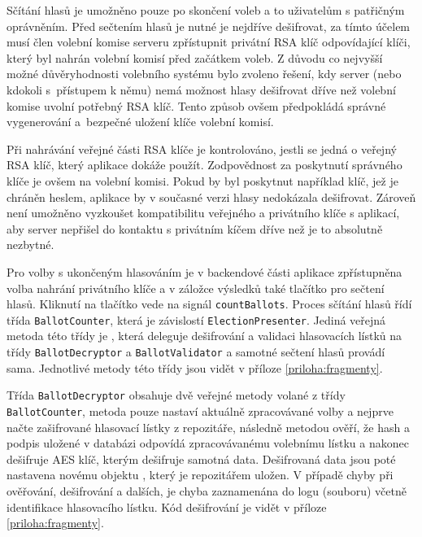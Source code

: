 Sčítání hlasů je umožněno pouze po skončení voleb a to uživatelům s patřičným oprávněním. Před sečtením hlasů je nutné je nejdříve dešifrovat, za tímto účelem musí člen volební komise serveru zpřístupnit privátní RSA klíč odpovídající klíči, který byl nahrán volební komisí před začátkem voleb. Z důvodu co nejvyšší možné důvěryhodnosti volebního systému bylo zvoleno řešení, kdy server (nebo kdokoli s~přístupem k němu) nemá možnost hlasy dešifrovat dříve než volební komise uvolní potřebný RSA klíč. Tento způsob ovšem předpokládá správné vygenerování a~bezpečné uložení klíče volební komisí.

Při nahrávání veřejné části RSA klíče je kontrolováno, jestli se jedná o veřejný RSA klíč, který aplikace dokáže použít. Zodpovědnost za poskytnutí správného klíče je ovšem na volební komisi. Pokud by byl poskytnut například klíč, jež je chráněn heslem, aplikace by v současné verzi hlasy nedokázala dešifrovat. Zároveň není umožněno vyzkoušet kompatibilitu veřejného a privátního klíče s aplikací, aby server nepřišel do kontaktu s privátním kíčem dříve než je to absolutně nezbytné.

Pro volby s ukončeným hlasováním je v backendové části aplikace zpřístupněna volba nahrání privátního klíče a v záložce výsledků také tlačítko pro sečtení hlasů. Kliknutí na tlačítko vede na signál \texttt{countBallots}. Proces sčítání hlasů řídí třída \texttt{BallotCounter}, která je závislostí \texttt{ElectionPresenter}. Jediná veřejná metoda této třídy je %
, která deleguje dešifrování a validaci hlasovacích lístků na třídy \texttt{BallotDecryptor} a \texttt{BallotValidator} a samotné sečtení hlasů provádí sama. Jednotlivé metody této třídy jsou vidět v příloze \ref{priloha:fragmenty}.

Třída \texttt{BallotDecryptor} obsahuje dvě veřejné metody volané z třídy \texttt{BallotCounter}, metoda  pouze nastaví aktuálně zpracovávané volby a  nejprve načte zašifrované hlasovací lístky z repozitáře, následně metodou %
 ověří, že hash a podpis uložené v databázi odpovídá zpracovávanému volebnímu lístku a nakonec dešifruje AES klíč, kterým dešifruje samotná data. Dešifrovaná data jsou poté nastavena novému objektu , který je repozitářem uložen. V případě chyby při ověřování, dešifrování a dalších, je chyba zaznamenána do logu (souboru) včetně identifikace hlasovacího lístku. Kód dešifrování je vidět v příloze \ref{priloha:fragmenty}.
  
